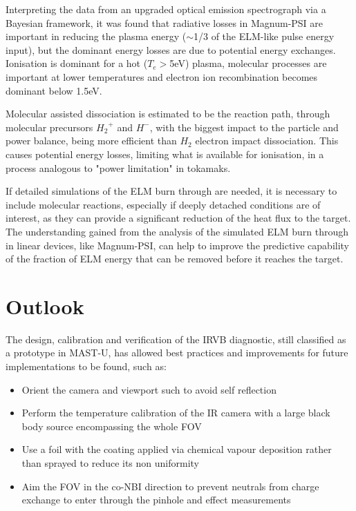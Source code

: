 Interpreting the data from an upgraded optical emission spectrograph via a Bayesian framework, it was found that radiative losses in Magnum-PSI are important in reducing the plasma energy ($\sim$1/3 of the ELM-like pulse energy input), but the dominant energy losses are due to potential energy exchanges. Ionisation is dominant for a hot ($T_e>$5eV) plasma, molecular processes are important at lower temperatures and electron ion recombination becomes dominant below 1.5eV.

Molecular assisted dissociation is estimated to be the reaction path, through molecular precursors ${H_2}^+$ and $H^-$, with the biggest impact to the particle and power balance, being more efficient than ${H_2}$ electron impact dissociation. This causes potential energy losses, limiting what is available for ionisation, in a process analogous to "power limitation" in tokamaks.

If detailed simulations of the ELM burn through are needed, it is necessary to include molecular reactions, especially if deeply detached conditions are of interest, as they can provide a significant reduction of the heat flux to the target. The understanding gained from the analysis of the simulated ELM burn through in linear devices, like Magnum-PSI, can help to improve the predictive capability of the fraction of ELM energy that can be removed before it reaches the target.


\section{Outlook}\label{Outlook}


The design, calibration and verification of the IRVB diagnostic, still classified as a prototype in MAST-U, has allowed best practices and improvements for future implementations to be found, such as:

\begin{itemize}
    \item Orient the camera and viewport such to avoid self reflection
    \item Perform the temperature calibration of the IR camera with a large black body source encompassing the whole FOV
    \item Use a foil with the coating applied via chemical vapour deposition rather than sprayed to reduce its non uniformity
    \item Aim the FOV in the co-NBI direction to prevent neutrals from charge exchange to enter through the pinhole and effect measurements
\end{itemize}

